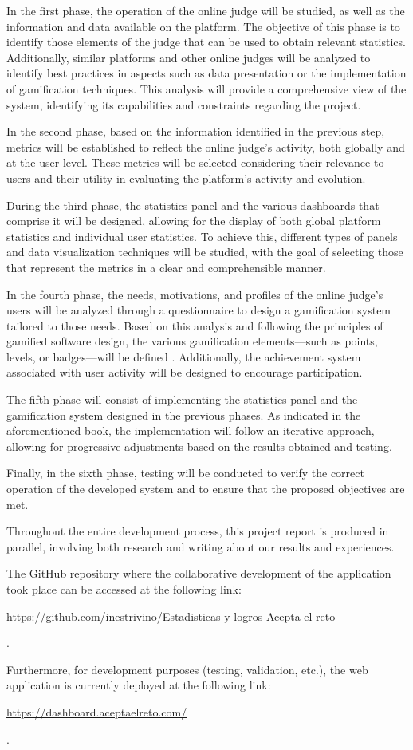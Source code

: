 In the first phase, the operation of the online judge \aer will be studied, as well as the information and data available on the platform. The objective of this phase is to identify those elements of the judge that can be used to obtain relevant statistics. Additionally, similar platforms and other online judges will be analyzed to identify best practices in aspects such as data presentation or the implementation of gamification techniques. This analysis will provide a comprehensive view of the system, identifying its capabilities and constraints regarding the project.

In the second phase, based on the information identified in the previous step, metrics will be established to reflect the online judge's activity, both globally and at the user level. These metrics will be selected considering their relevance to users and their utility in evaluating the platform's activity and evolution.

During the third phase, the statistics panel and the various dashboards that comprise it will be designed, allowing for the display of both global platform statistics and individual user statistics. To achieve this, different types of panels and data visualization techniques will be studied, with the goal of selecting those that represent the metrics in a clear and comprehensible manner.

In the fourth phase, the needs, motivations, and profiles of the online judge's users will be analyzed through a questionnaire to design a gamification system tailored to those needs. Based on this analysis and following the principles of gamified software design, the various gamification elements—such as points, levels, or badges—will be defined \cite{Zichermann_Cunningham_2011}. Additionally, the achievement system associated with user activity will be designed to encourage participation.

The fifth phase will consist of implementing the statistics panel and the gamification system designed in the previous phases. As indicated in the aforementioned book, the implementation will follow an iterative approach, allowing for progressive adjustments based on the results obtained and testing.

Finally, in the sixth phase, testing will be conducted to verify the correct operation of the developed system and to ensure that the proposed objectives are met.

Throughout the entire development process, this project report is produced in parallel, involving both research and writing about our results and experiences.

The GitHub repository where the collaborative development of the application took place can be accessed at the following link:
\begin{center}
\url{https://github.com/inestrivino/Estadisticas-y-logros-Acepta-el-reto}
\end{center}.

Furthermore, for development purposes (testing, validation, etc.), the web application is currently deployed at the following link:
\begin{center}
\url{https://dashboard.aceptaelreto.com/}
\end{center}.